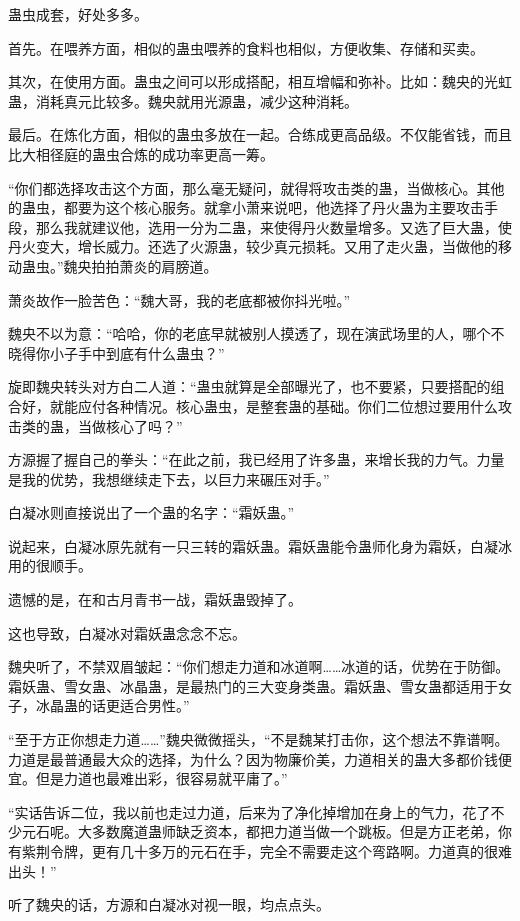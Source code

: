 \begin{this_body}
蛊虫成套，好处多多。

首先。在喂养方面，相似的蛊虫喂养的食料也相似，方便收集、存储和买卖。

其次，在使用方面。蛊虫之间可以形成搭配，相互增幅和弥补。比如：魏央的光虹蛊，消耗真元比较多。魏央就用光源蛊，减少这种消耗。

最后。在炼化方面，相似的蛊虫多放在一起。合练成更高品级。不仅能省钱，而且比大相径庭的蛊虫合炼的成功率更高一筹。

“你们都选择攻击这个方面，那么毫无疑问，就得将攻击类的蛊，当做核心。其他的蛊虫，都要为这个核心服务。就拿小萧来说吧，他选择了丹火蛊为主要攻击手段，那么我就建议他，选用一分为二蛊，来使得丹火数量增多。又选了巨大蛊，使丹火变大，增长威力。还选了火源蛊，较少真元损耗。又用了走火蛊，当做他的移动蛊虫。”魏央拍拍萧炎的肩膀道。

萧炎故作一脸苦色：“魏大哥，我的老底都被你抖光啦。”

魏央不以为意：“哈哈，你的老底早就被别人摸透了，现在演武场里的人，哪个不晓得你小子手中到底有什么蛊虫？”

旋即魏央转头对方白二人道：“蛊虫就算是全部曝光了，也不要紧，只要搭配的组合好，就能应付各种情况。核心蛊虫，是整套蛊的基础。你们二位想过要用什么攻击类的蛊，当做核心了吗？”

方源握了握自己的拳头：“在此之前，我已经用了许多蛊，来增长我的力气。力量是我的优势，我想继续走下去，以巨力来碾压对手。”

白凝冰则直接说出了一个蛊的名字：“霜妖蛊。”

说起来，白凝冰原先就有一只三转的霜妖蛊。霜妖蛊能令蛊师化身为霜妖，白凝冰用的很顺手。

遗憾的是，在和古月青书一战，霜妖蛊毁掉了。

这也导致，白凝冰对霜妖蛊念念不忘。

魏央听了，不禁双眉皱起：“你们想走力道和冰道啊……冰道的话，优势在于防御。霜妖蛊、雪女蛊、冰晶蛊，是最热门的三大变身类蛊。霜妖蛊、雪女蛊都适用于女子，冰晶蛊的话更适合男性。”

“至于方正你想走力道……”魏央微微摇头，“不是魏某打击你，这个想法不靠谱啊。力道是最普通最大众的选择，为什么？因为物廉价美，力道相关的蛊大多都价钱便宜。但是力道也最难出彩，很容易就平庸了。”

“实话告诉二位，我以前也走过力道，后来为了净化掉增加在身上的气力，花了不少元石呢。大多数魔道蛊师缺乏资本，都把力道当做一个跳板。但是方正老弟，你有紫荆令牌，更有几十多万的元石在手，完全不需要走这个弯路啊。力道真的很难出头！”

听了魏央的话，方源和白凝冰对视一眼，均点点头。


\end{this_body}
